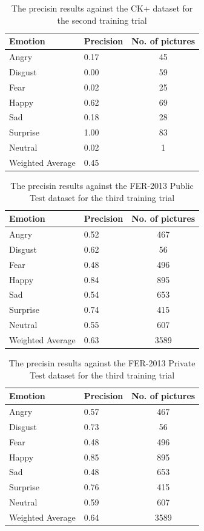 \documentclass[runningheads,a4paper,11pt]{report}
\begin{document}
\begin{table}[htbp]
	\caption{The precisin results against the CK+ dataset for the second training trial}
	\label{fer_training_28k_001_ckp}
		\begin{center}
			\begin{tabular}{p{110pt}p{110pt}c}
				\textbf{Emotion}& \textbf{Precision}& \textbf{No. of pictures} \\
				\hline\hline
				Angry& 0.17& 45 \\
				Disgust& 0.00& 59 \\
				Fear& 0.02& 25 \\
				Happy& 0.62& 69 \\
				Sad& 0.18& 28 \\
				Surprise& 1.00& 83 \\
				Neutral& 0.02& 1 \\
				\hline
				Weighted Average& 0.45
			\end{tabular}
		\end{center}
\end{table}
\begin{table}[htbp]
	\caption{The precisin results against the FER-2013 Public Test dataset for the third training trial}
	\label{fer_training_28k_001_public_test}
		\begin{center}
			\begin{tabular}{p{110pt}p{110pt}c}
				\textbf{Emotion}& \textbf{Precision}& \textbf{No. of pictures} \\
				\hline\hline
				Angry& 0.52& 467 \\
				Disgust& 0.62& 56 \\
				Fear& 0.48& 496 \\
				Happy& 0.84& 895 \\
				Sad& 0.54& 653 \\
				Surprise& 0.74& 415 \\
				Neutral& 0.55& 607 \\
				\hline
				Weighted Average& 0.63 &3589
			\end{tabular}
		\end{center}
\end{table}
\begin{table}[htbp]
	\caption{The precisin results against the FER-2013 Private Test dataset for the third training trial}
	\label{fer_training_28k_001_private_test}
		\begin{center}
			\begin{tabular}{p{110pt}p{110pt}c}
				\textbf{Emotion}& \textbf{Precision}& \textbf{No. of pictures} \\
				\hline\hline
				Angry& 0.57& 467 \\
				Disgust& 0.73& 56 \\
				Fear& 0.48& 496 \\
				Happy& 0.85& 895 \\
				Sad& 0.48& 653 \\
				Surprise& 0.76& 415 \\
				Neutral& 0.59& 607 \\
				\hline
				Weighted Average& 0.64 &3589
			\end{tabular}
		\end{center}
\end{table}
\pagebreak
\end{document}
